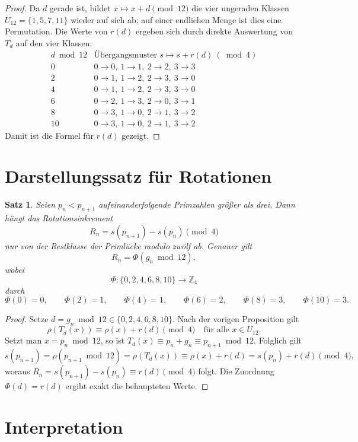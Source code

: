 \documentclass[11pt]{article}
\newtheorem{theorem}{Satz}
\theoremstyle{definition}
\begin{document}
\begin{proof}
Da $d$ gerade ist, bildet $x\mapsto x+d\pmod{12}$ die vier ungeraden Klassen
$U_{12}=\{1,5,7,11\}$ wieder auf sich ab; auf einer endlichen Menge ist dies eine Permutation.
Die Werte von $r(d)$ ergeben sich durch direkte Auswertung von $T_d$ auf den vier Klassen:
\[
\begin{array}{c|c}
d \bmod 12 & \text{\"Ubergangsmuster } s\mapsto s+r(d)\ (\bmod 4)\\
\hline
0   & 0\to0,\ 1\to1,\ 2\to2,\ 3\to3\\
2   & 0\to1,\ 1\to2,\ 2\to3,\ 3\to0\\
4   & 0\to1,\ 1\to2,\ 2\to3,\ 3\to0\\
6   & 0\to2,\ 1\to3,\ 2\to0,\ 3\to1\\
8   & 0\to3,\ 1\to0,\ 2\to1,\ 3\to2\\
10  & 0\to3,\ 1\to0,\ 2\to1,\ 3\to2
\end{array}
\]
Damit ist die Formel f\"ur $r(d)$ gezeigt.
\end{proof}

\section{Darstellungssatz f\"ur Rotationen}

\begin{theorem}
Seien $p_n<p_{n+1}$ aufeinanderfolgende Primzahlen gr\"o{\ss}er als drei.
Dann h\"angt das Rotationsinkrement
\[
R_n=s(p_{n+1})-s(p_n)\pmod 4
\]
nur von der Restklasse der Priml\"ucke modulo zw\"olf ab.
Genauer gilt
\[
R_n=\Phi(g_n\bmod 12),
\]
wobei
\[
\Phi:\{0,2,4,6,8,10\}\rightarrow\mathbb{Z}_4
\]
durch
\[
\Phi(0)=0,\qquad
\Phi(2)=1,\qquad
\Phi(4)=1,\qquad
\Phi(6)=2,\qquad
\Phi(8)=3,\qquad
\Phi(10)=3.
\]
\end{theorem}

\begin{proof}
Setze $d=g_n\bmod 12\in\{0,2,4,6,8,10\}$.
Nach der vorigen Proposition gilt
\[
\rho(T_d(x))\equiv \rho(x)+r(d)\pmod 4
\quad\text{f\"ur alle }x\in U_{12}.
\]
Setzt man $x=p_n\bmod 12$, so ist $T_d(x)\equiv p_n+g_n\equiv p_{n+1}\bmod 12$.
Folglich gilt
\[
s(p_{n+1})=\rho(p_{n+1}\bmod 12)=\rho(T_d(x))\equiv \rho(x)+r(d)=s(p_n)+r(d)\pmod 4,
\]
woraus $R_n=s(p_{n+1})-s(p_n)\equiv r(d)\pmod 4$ folgt.
Die Zuordnung $\Phi(d)=r(d)$ ergibt exakt die behaupteten Werte.
\end{proof}

\section{Interpretation}
\end{document}
